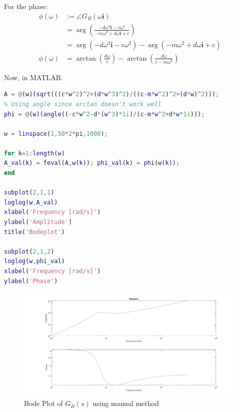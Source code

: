 \documentclass{article}
\begin{document}
For the phase: 
\begin{align*}
    \phi(\omega) &:=\angle G_{B}(\omega \mathbf{i}) \\
 &=\arg\left(\frac{-d\omega^3\mathbf{i}-c\omega^2}{-m\omega^2+d\omega \mathbf{i}+c}\right) \\
 &=\arg(-d\omega^3\mathbf{i}-c\omega^2)-\arg(-m\omega^2+d\omega \mathbf{i}+c) \\
\phi(\omega) &=\arctan\left(\frac{d\omega}{c}\right)-\arctan\left(\frac{d\omega}{c-m\omega^2}\right)
\end{align*}

Now, in MATLAB. 

\begin{lstlisting}[language=Matlab, caption={Script to Plot Bode Diagram Manually}]
%% Manual Bode
A = @(w)(sqrt(((c*w^2)^2+(d*w^3)^2)/((c-m*w^2)^2+(d*w)^2)));
% Using angle since arctan doesn't work well
phi = @(w)(angle((-c*w^2-d*(w^3)*1i)/(c-m*w^2+d*w*1i))); 

w = linspace(1,50*2*pi,1000);

for k=1:length(w)
A_val(k) = feval(A,w(k)); phi_val(k) = phi(w(k));
end

subplot(2,1,1)
loglog(w,A_val)
xlabel('Frequency [rad/s]')
ylabel('Amplitude')
title('Bodeplot') 

subplot(2,1,2)
loglog(w,phi_val)
xlabel('Frequency [rad/s]')
ylabel('Phase')
\end{lstlisting}

\begin{figure} [H]
    \centering
    \includegraphics[width=1\linewidth]{BodePlot_SingleMass_Acc_Manual.png}
    \caption{Bode Plot of $G_B(s)$ using manual method}
    \label{fig:BodePlotManual}
\end{figure}
\end{document}
